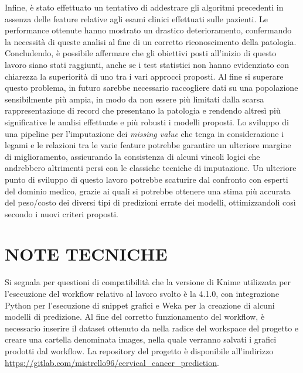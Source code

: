 Infine, è stato effettuato un tentativo di addestrare gli algoritmi precedenti in assenza delle feature relative agli esami clinici effettuati sulle pazienti. Le performance ottenute hanno mostrato un drastico deterioramento, confermando la necessità di queste analisi al fine di un corretto riconoscimento della patologia.
Concludendo, è possibile affermare che gli obiettivi posti all'inizio di questo lavoro siano stati raggiunti, anche se i test statistici non hanno evidenziato con chiarezza la superiorità di uno tra i vari approcci proposti.
Al fine si superare questo problema, in futuro sarebbe necessario raccogliere dati su una popolazione sensibilmente più ampia, in modo da non essere più limitati dalla scarsa rappresentazione di record che presentano la patologia e rendendo altresì più significative le analisi effettuate e più robusti i modelli proposti.
Lo sviluppo di una pipeline per l'imputazione dei \textit{missing value} che tenga in considerazione i legami e le relazioni tra le varie feature potrebbe garantire un ulteriore margine di miglioramento, assicurando la consistenza di alcuni vincoli logici che andrebbero altrimenti persi con le classiche tecniche di imputazione.
Un ulteriore punto di sviluppo di questo lavoro potrebbe scaturire dal confronto con esperti del dominio medico, grazie ai quali si potrebbe ottenere una stima più accurata del peso/costo dei diversi tipi di predizioni errate dei modelli, ottimizzandoli così secondo i nuovi criteri proposti.

\section*{NOTE TECNICHE}
Si segnala per questioni di compatibilità che la versione di Knime utilizzata per l'esecuzione del workflow relativo al lavoro svolto è la 4.1.0, con integrazione Python per l'esecuzione di snippet grafici e Weka per la creazione di alcuni modelli di predizione.
Al fine del corretto funzionamento del workflow, è necessario inserire il dataset ottenuto da \cite{ML} nella radice del workspace del progetto e creare una cartella denominata images, nella quale verranno salvati i grafici prodotti dal workflow.
La repository del progetto è disponibile all'indirizzo\\\url{https://gitlab.com/mistrello96/cervical_cancer_prediction}.